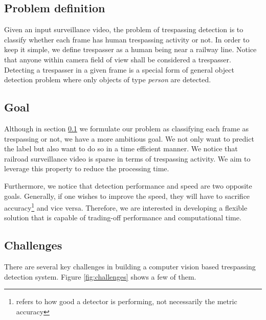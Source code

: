 \subsection{Problem definition}
\label{sec:problem-definition}
Given an input surveillance video, the problem of trespassing detection is to classify whether each frame has  human trespassing activity or not. In order to keep it simple, we define trespasser as a human being near a railway line. Notice that anyone within camera field of view shall be considered a trespasser. Detecting a trespasser in a given frame is a special form of general object detection problem where only objects of type \textit{person} are detected.

\subsection{Goal}
\label{sec:goal}
Although in section \ref{sec:problem-definition} we formulate our problem as classifying each frame as trespassing or not, we have a more ambitious goal. We not only want to predict the label but also want to do so in a time efficient manner. We notice that railroad surveillance video is sparse in terms of trespassing activity. We aim to leverage this property to reduce the processing time.  

Furthermore, we notice that detection performance and speed are two opposite goals. Generally, if one wishes to improve the speed, they will have to sacrifice accuracy\footnote{refers to how good a detector is performing, not necessarily the metric accuracy} and vice versa. Therefore, we are interested in developing a flexible solution that is capable of trading-off performance and computational time. 



\subsection{Challenges}
\label{sec:challenges}
There are several key challenges in building a computer vision based trespassing detection system. Figure \ref{fig:challenges} shows a few of them. 

